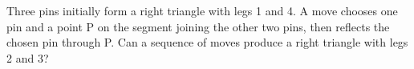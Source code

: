 Three pins initially form a right triangle with legs 1 and 4. A move chooses one pin and a point P on the segment joining the other two pins, then reflects the chosen pin through P. Can a sequence of moves produce a right triangle with legs 2 and 3?
